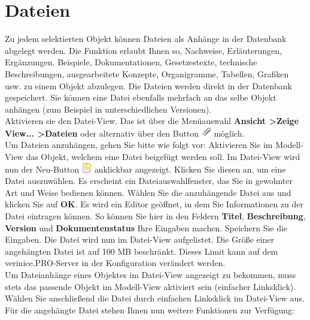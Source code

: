 \documentclass[a4paper,10pt]{book}
\begin{document}
\section{Dateien} \label{Dateien}
Zu jedem selektierten Objekt können Dateien als Anhänge in der Datenbank abgelegt werden. Die Funktion erlaubt Ihnen so, Nachweise,
Erläuterungen, Ergänzungen, Beispiele, Dokumentationen, Gesetzestexte, technische Beschreibungen, ausgearbeitete Konzepte, Organigramme,
Tabellen, Grafiken usw. zu einem Objekt abzulegen. Die Dateien werden direkt in der Datenbank gespeichert. Sie können eine Datei ebenfalls
mehrfach an das selbe Objekt anhängen (zum Beispiel in unterschiedlichen Versionen).
\newline\\
Aktivieren sie den Datei-View. Das ist über die Menüauswahl \textbf{Ansicht \textgreater Zeige View... \textgreater Dateien} oder alternativ
über den Button \includegraphics[height=2ex]{Icon/Hinzufuegen.png} möglich.
\newline\\
Um Dateien anzuhängen, gehen Sie bitte wie folgt vor: Aktivieren Sie im Modell-View das Objekt, welchem eine Datei beigefügt werden soll.
Im Datei-View wird nun der Neu-Button \includegraphics[height=2ex]{Icon/Oeffnen.png} anklickbar angezeigt. Klicken Sie diesen an, um eine Datei auszuwählen. Es erscheint ein
Dateiauswahlfenster, das Sie in gewohnter Art und Weise bedienen können. Wählen Sie die anzuhängende Datei aus und klicken Sie auf \textbf{OK}.
Es wird ein Editor geöffnet, in dem Sie Informationen zu der Datei eintragen können. So können Sie hier in den Feldern \textbf{Titel}, \textbf{Beschreibung},
\textbf{Version} und \textbf{Dokumentenstatus} Ihre Eingaben machen. Speichern Sie die Eingaben. Die Datei wird nun im Datei-View aufgelistet. Die Größe einer angehängten Datei ist auf 100 MB beschränkt. Dieses Limit kann auf dem verinice.PRO-Server in der Konfiguration verändert werden.
\newline\\
Um Dateianhänge eines Objektes im Datei-View angezeigt zu bekommen, muss stets das passende Objekt im Modell-View aktiviert sein (einfacher Linksklick). Wählen Sie anschließend die Datei durch einfachen Linksklick im Datei-View aus. Für die angehängte Datei stehen Ihnen nun weitere Funktionen zur Verfügung:
\end{document}
